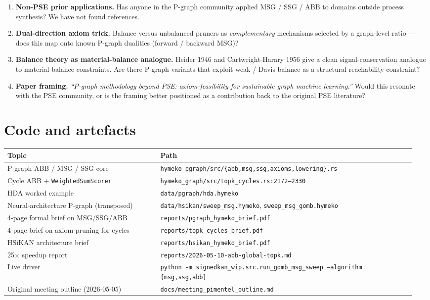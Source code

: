\documentclass[11pt,a4paper]{article}
\newcommand{\code}[1]{\texttt{\small #1}}
\begin{document}
\begin{enumerate}
\item \textbf{Non-PSE prior applications.} Has anyone in the P-graph
      community applied MSG / SSG / ABB to domains outside process
      synthesis? We have not found references.
\item \textbf{Dual-direction axiom trick.} Balance versus unbalanced
      pruners as \emph{complementary} mechanisms selected by a
      graph-level ratio --- does this map onto known P-graph dualities
      (forward / backward MSG)?
\item \textbf{Balance theory as material-balance analogue.} Heider 1946
      and Cartwright-Harary 1956 give a clean signal-conservation
      analogue to material-balance constraints. Are there P-graph
      variants that exploit weak / Davis balance as a structural
      reachability constraint?
\item \textbf{Paper framing.} \emph{``P-graph methodology beyond PSE:
      axiom-feasibility for sustainable graph machine learning.''}
      Would this resonate with the PSE community, or is the framing
      better positioned as a contribution back to the original
      PSE literature?
\end{enumerate}

\section*{Code and artefacts}

\begin{center}\small
\begin{tabular}{p{0.36\linewidth} p{0.60\linewidth}}
\toprule
Topic & Path \\
\midrule
P-graph ABB / MSG / SSG core & \code{hymeko\_pgraph/src/\{abb,msg,ssg,axioms,lowering\}.rs} \\
Cycle ABB $+$ \code{WeightedSumScorer} & \code{hymeko\_graph/src/topk\_cycles.rs:2172--2330} \\
HDA worked example & \code{data/pgraph/hda.hymeko} \\
Neural-architecture P-graph (transposed) & \code{data/hsikan/sweep\_msg.hymeko}, \code{sweep\_msg\_gomb.hymeko} \\
4-page formal brief on MSG/SSG/ABB & \code{reports/pgraph\_hymeko\_brief.pdf} \\
4-page brief on axiom-pruning for cycles & \code{reports/topk\_cycles\_brief.pdf} \\
HSiKAN architecture brief & \code{reports/hsikan\_hymeko\_brief.pdf} \\
25$\times$ speedup report & \code{reports/2026-05-10-abb-global-topk.md} \\
Live driver & \code{python -m signedkan\_wip.src.run\_gomb\_msg\_sweep --algorithm \{msg,ssg,abb\}} \\
Original meeting outline (2026-05-05) & \code{docs/meeting\_pimentel\_outline.md} \\
\bottomrule
\end{tabular}
\end{center}
\end{document}
